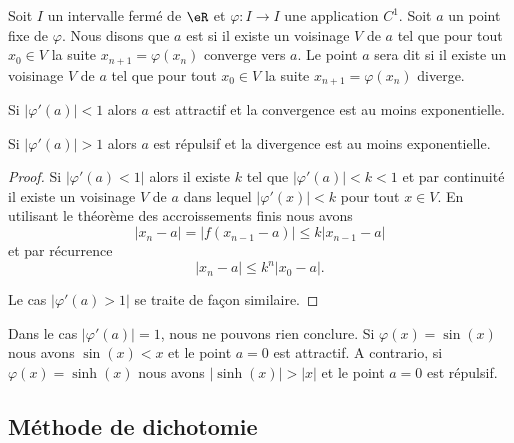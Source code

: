 Soit \( I\) un intervalle fermé de \( \eR\) et \( \varphi\colon I\to I\) une application \( C^1\). Soit \( a\) un point fixe de \( \varphi\). Nous disons que \( a\) est  si il existe un voisinage \( V\) de \( a\) tel que pour tout \( x_0\in V\) la suite \( x_{n+1}=\varphi(x_n)\) converge vers \( a\). Le point \( a\) sera dit  si il existe un voisinage \( V\) de \( a\) tel que pour tout \( x_0\in V\) la suite \( x_{n+1}=\varphi(x_n)\) diverge.

\begin{lemma}   \label{LemfipGZG}
    Si \( | \varphi'(a) |<1\) alors \( a\) est attractif et la convergence est au moins exponentielle.

    Si \( | \varphi'(a) |>1\) alors \( a\) est répulsif et la divergence est au moins exponentielle.
\end{lemma}

\begin{proof}
    Si \( | \varphi'(a)<1 |\) alors il existe \( k\) tel que \( | \varphi'(a) |<k<1\) et par continuité il existe un voisinage \( V\) de \( a\) dans lequel \( | \varphi'(x) |<k\) pour tout \( x\in V\). En utilisant le théorème des accroissements finis nous avons
    \begin{equation}
        | x_n-a |=\big| f(x_{n-1}-a) \big|\leq k| x_{n-1}-a |
    \end{equation}
    et par récurrence
    \begin{equation}
        | x_n-a |\leq k^n| x_0-a |.
    \end{equation}

    Le cas \( | \varphi'(a)>1 |\) se traite de façon similaire.
\end{proof}

\begin{remark}
    Dans le cas \(| \varphi'(a) |=1\), nous ne pouvons rien conclure. Si \( \varphi(x)=\sin(x)\) nous avons \( \sin(x)<x\) et le point \( a=0\) est attractif. A contrario, si \( \varphi(x)=\sinh(x)\) nous avons \( |\sinh(x)|>|x|\) et le point \( a=0\) est répulsif.
\end{remark}

\subsection{Méthode de dichotomie}

